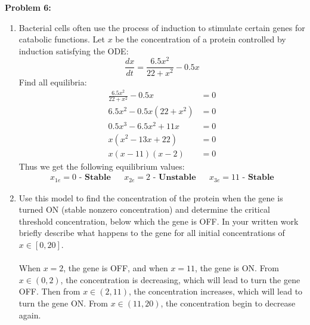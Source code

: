 \documentclass[12pt]{article}
\begin{document}
\newpage

\noindent \textbf{Problem 6: }
	\begin{enumerate}[label = (\alph*)]
		\item Bacterial cells often use the process of induction to stimulate certain genes for catabolic functions. Let $x$ be the concentration of a protein controlled by induction satisfying the ODE:
			$$
			\frac{dx}{dt} = \frac{6.5x^2}{22 + x^2} -0.5x
			$$
		Find all equilibria:
			\begin{align*}
				\frac{6.5x^2}{22 + x^2} -0.5x &= 0\\
				6.5x^2 - 0.5x(22 + x^2) &= 0 \\
				0.5x^3 - 6.5x^2 + 11x &= 0 \\
				x(x^2 - 13x + 22) &= 0 \\
				x(x-11)(x-2) &= 0
			\end{align*}
		Thus we get the following equilibrium values:
			\boldmath
			\begin{align*}
				x_{1e} = 0 \textbf{ - Stable} && x_{2e} = 2 \textbf{ - Unstable} && x_{3e} = 11 \textbf{ - Stable}
			\end{align*}
			\unboldmath
		\item Use this model to find the concentration of the protein when the gene is turned ON (stable nonzero concentration) and determine the critical threshold concentration, below which the gene is OFF. In your written work briefly describe what happens to the gene for all initial concentrations of $x \in [0, 20]$.
		\\ \\
		When $x  = 2$, the gene is OFF, and when $x = 11$, the gene is ON.  From $x \in (0,2)$, the concentration is decreasing, which will lead to turn the gene OFF. Then from $x \in (2,11)$, the concentration increases, which will lead to turn the gene ON. From $x \in (11,20)$, the concentration begin to decrease again.
		
	\end{enumerate}

\newpage
\end{document}
